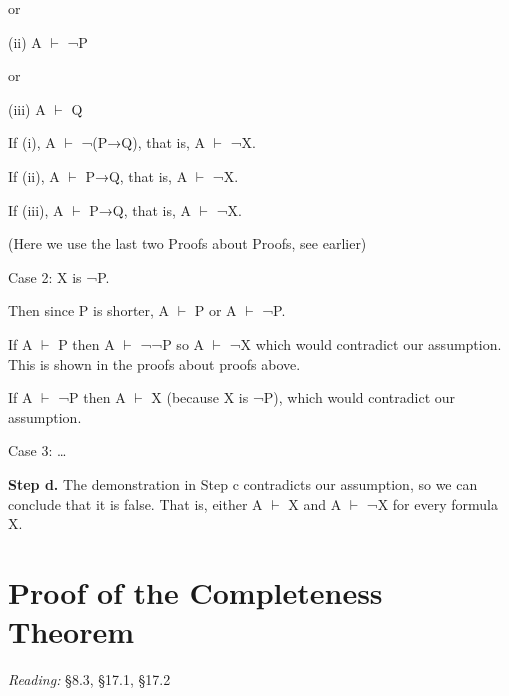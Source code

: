 \documentclass[12pt]{extarticle}
\begin{document}
\begin{multicols*}{3}
\hspace{5mm} or
 
\hspace{5mm} (ii) A $\vdash$ ¬P
 
\hspace{5mm} or
 
\hspace{5mm} (iii) A $\vdash$ Q
 
\hspace{5mm} If (i), A $\vdash$ ¬(P→Q), that is, A $\vdash$ ¬X.
 
\hspace{5mm} If (ii), A $\vdash$ P→Q, that is, A $\vdash$ ¬X.
 
\hspace{5mm} If (iii), A $\vdash$ P→Q, that is, A $\vdash$ ¬X.
 
\hspace{5mm} (Here we use the last two Proofs about Proofs, see earlier)
 
Case 2: X is ¬P.
 
\hspace{5mm} Then since P is shorter, A $\vdash$ P or A $\vdash$ ¬P.
 
\hspace{5mm} If A $\vdash$ P then A $\vdash$ ¬¬P so A $\vdash$ ¬X which would contradict our assumption. This is shown in the proofs about proofs above.
 
\hspace{5mm} If A $\vdash$ ¬P then A $\vdash$ X (because X is ¬P), which would contradict our assumption.
 
Case 3: …
 
\textbf{Step d.} The demonstration in Step c contradicts our assumption, so we can conclude that it is false. That is, either A $\vdash$ X and A $\vdash$ ¬X for every formula X.
 
 
 
\section{Proof of the Completeness Theorem}
 
\emph{Reading:} §8.3, §17.1, §17.2
 

\end{multicols*}
\end{document}
